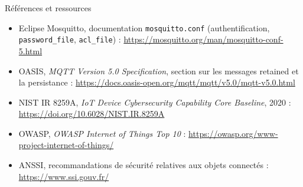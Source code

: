\documentclass[aspectratio=169]{beamer}
\begin{document}
\begin{frame}{Références et ressources}
  \tiny
  \begin{itemize}
    \item Eclipse Mosquitto, documentation \texttt{mosquitto.conf} (authentification, \texttt{password\_file}, \texttt{acl\_file}) : \url{https://mosquitto.org/man/mosquitto-conf-5.html}
    \item OASIS, \emph{MQTT Version 5.0 Specification}, section sur les messages retained et la persistance : \url{https://docs.oasis-open.org/mqtt/mqtt/v5.0/mqtt-v5.0.html}
    \item NIST IR 8259A, \emph{IoT Device Cybersecurity Capability Core Baseline}, 2020 : \url{https://doi.org/10.6028/NIST.IR.8259A}
    \item OWASP, \emph{OWASP Internet of Things Top 10} : \url{https://owasp.org/www-project-internet-of-things/}
    \item ANSSI, recommandations de sécurité relatives aux objets connectés : \url{https://www.ssi.gouv.fr/}
  \end{itemize}
\end{frame}
\end{document}

